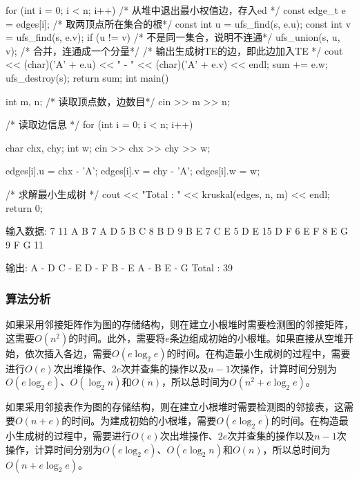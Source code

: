 \begin{Codex}[label=kruskal.cpp]
{        for (int i = 0; i < n; i++) {
            /* 从堆中退出最小权值边，存入ed */
            const edge_t e = edges[i];
            /* 取两顶点所在集合的根*/
            const int u = ufs_find(s, e.u);
            const int v = ufs_find(s, e.v);
            if (u != v) { /* 不是同一集合，说明不连通*/
                ufs_union(s, u, v); /* 合并，连通成一个分量*/
                /* 输出生成树TE的边，即此边加入TE */
                cout << (char)('A' + e.u) << " - " << (char)('A' + e.v) << endl;
                sum += e.w;
            }
        }
        ufs_destroy(s);
        return sum;
    }
    int main() {
        int m, n;
        /* 读取顶点数，边数目*/
        cin >> m >> n;

        /* 读取边信息 */
        for (int i = 0; i < n; i++) {
            char chx, chy;
            int w;
            cin >> chx >> chy >> w;

            edges[i].u = chx - 'A';
            edges[i].v = chy - 'A';
            edges[i].w = w;
        }

        /* 求解最小生成树 */
        cout << "Total : " << kruskal(edges, n, m) << endl;
        return 0;
    }

    输入数据:
        7 11
        A B 7
        A D 5
        B C 8
        B D 9
        B E 7
        C E 5
        D E 15
        D F 6
        E F 8
        E G 9
        F G 11

    输出:
        A - D
        C - E
        D - F
        B - E
        A - B
        E - G
        Total : 39
\end{Codex}

\subsubsection{算法分析}
如果采用邻接矩阵作为图的存储结构，则在建立小根堆时需要检测图的邻接矩阵，这需要$O(n^2)$的时间。此外，需要将$e$条边组成初始的小根堆。如果直接从空堆开始，依次插入各边，需要$O(e\log_2e)$的时间。在构造最小生成树的过程中，需要进行$O(e)$次出堆操作、$2e$次并查集的操作以及$n-1$次操作，计算时间分别为$O(e\log_2e)$、$O(\log_2n)$和$O(n)$，所以总时间为$O(n^2+e\log_2e)$。

如果采用邻接表作为图的存储结构，则在建立小根堆时需要检测图的邻接表，这需要$O(n+e)$的时间。为建成初始的小根堆，需要$O(e\log_2e)$的时间。在构造最小生成树的过程中，需要进行$O(e)$次出堆操作、$2e$次并查集的操作以及$n-1$次操作，计算时间分别为$O(e\log_2e)$、$O(e\log_2n)$和$O(n)$，所以总时间为$O(n+e\log_2e)$。


